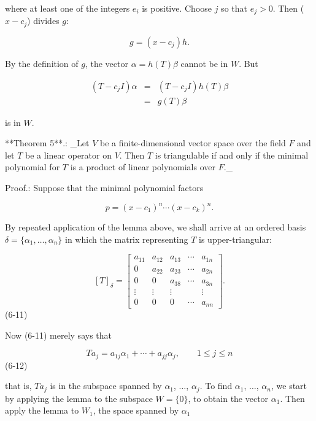 where at least one of the integers \(e_{i}\) is positive. Choose \(j\) so that \(e_{j}>0\). Then (\(x-c_{j}\)) divides \(g\):

\[g=(x-c_{j})h.\]

By the definition of \(g\), the vector \(\alpha=h(T)\beta\) cannot be in \(W\). But

\[\begin{array}{rl}(T-c_{j}I)\alpha&=&(T-c_{j}I)h(T)\beta\\ &=&g(T)\beta\end{array}\]

is in \(W\).

**Theorem 5**.: _Let \(V\) be a finite-dimensional vector space over the field \(F\) and let \(T\) be a linear operator on \(V\). Then \(T\) is triangulable if and only if the minimal polynomial for \(T\) is a product of linear polynomials over \(F\)._

Proof.: Suppose that the minimal polynomial factors

\[p=(x-c_{1})^{n}\cdots(x-c_{k})^{n}.\]

By repeated application of the lemma above, we shall arrive at an ordered basis \(\delta=\{\alpha_{1},\ldots,\alpha_{n}\}\) in which the matrix representing \(T\) is upper-triangular:

\[[T]_{\delta}=\begin{bmatrix}a_{11}&a_{12}&a_{13}&\cdots&a_{1n}\\ 0&a_{22}&a_{23}&\cdots&a_{2n}\\ 0&0&a_{38}&\cdots&a_{3n}\\ \vdots&\vdots&\vdots&&\vdots\\ 0&0&0&\cdots&a_{nn}\end{bmatrix}.\] (6-11)

Now (6-11) merely says that

\[Ta_{j}=a_{1j}\alpha_{1}+\cdots+a_{jj}\alpha_{j},\qquad 1\leq j\leq n\] (6-12)

that is, \(Ta_{j}\) is in the subspace spanned by \(\alpha_{1}\), \(\ldots\), \(\alpha_{j}\). To find \(\alpha_{1}\), \(\ldots\), \(\alpha_{n}\), we start by applying the lemma to the subspace \(W=\{0\}\), to obtain the vector \(\alpha_{1}\). Then apply the lemma to \(W_{1}\), the space spanned by \(\alpha_{1}\) 